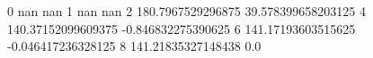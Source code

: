 0 nan nan
1 nan nan
2 180.7967529296875 39.578399658203125
4 140.37152099609375 -0.846832275390625
6 141.17193603515625 -0.046417236328125
8 141.21835327148438 0.0
